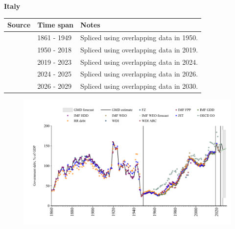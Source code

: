 \documentclass[12pt,a4paper,landscape]{article}
\begin{document}
\begin{adjustbox}{max totalsize={\paperwidth}{\paperheight},center}
\begin{minipage}[t][\textheight][t]{\textwidth}
\vspace*{0.5cm}
{}
\begin{center}
{\Large\bfseries Italy}
\end{center}
\vspace{0.5cm}
\begin{table}[H]
\centering
\small
\begin{tabular}{|l|l|l|}
\hline
\textbf{Source} & \textbf{Time span} & \textbf{Notes} \\
\hline
\rowcolor{white}\cite{IMF_FPP}& 1861 - 1949 &Spliced using overlapping data in 1950.\\
\rowcolor{lightgray}\cite{IMF_GDD}& 1950 - 2018 &Spliced using overlapping data in 2019.\\
\rowcolor{white}\cite{IMF_FPP}& 2019 - 2023 &Spliced using overlapping data in 2024.\\
\rowcolor{lightgray}\cite{OECD_EO}& 2024 - 2025 &Spliced using overlapping data in 2026.\\
\rowcolor{white}\cite{IMF_WEO_forecast}& 2026 - 2029 &Spliced using overlapping data in 2030.\\
\hline
\end{tabular}
\end{table}
\begin{figure}[H]
\centering
\includegraphics[width=\textwidth,height=0.6\textheight,keepaspectratio]{graphs/ITA_govdebt_GDP.pdf}
\end{figure}
\end{minipage}
\end{adjustbox}
\end{document}
